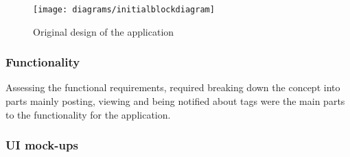 \begin{figure}[h!]
    \centering
    \texttt{[image: diagrams/initialblockdiagram]}
    \caption{Original design of the application}
    \label{fig:apex_block_diagram_image}
\end{figure} 

\subsubsection*{Functionality}

Assessing the functional requirements, required breaking down the concept into parts mainly posting, viewing and being notified about tags were the main parts to the functionality for the application.\\


\subsubsection*{UI mock-ups}

